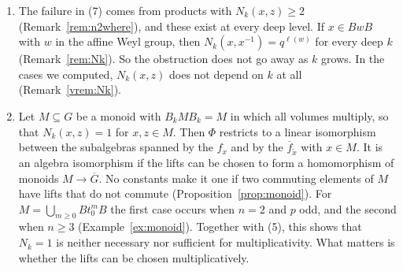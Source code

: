 \documentclass[12pt,letterpaper]{amsart}
\numberwithin{equation}{section}
\theoremstyle{definition}
\theoremstyle{remark}
\newcommand{\C}{\mathbb{C}}
\newcommand{\Gbar}{\overline{G}}
\newcommand{\fbar}{\overline{f}}
\begin{document}
\begin{enumerate}[leftmargin=2em]
homomorphism from $\Gbar$ to $\C^\times$ that is the identity on
$\mu_n$. Its kernel would then map isomorphically onto $G$, which would
give a splitting of the cover. No splitting exists, because a splitting
$s$ would satisfy $s(h(a))\,s(h(b))=(b,a)_n\,s(h(ab))$
(Lemma~\ref{lemma:nonsplit}). Choosing other lifts does not help, since
it only changes the constants by roots of unity. Constants of other
absolute values are ruled out for $n\geq 3$
(Corollary~\ref{corollary:main}), and for $n=2$ the question is open
(Question~\ref{q:n2}).
\item The failure in (7) comes from products with $N_k(x,z)\geq 2$
(Remark~\ref{rem:n2where}), and these exist at every deep level. If
$x\in BwB$ with $w$ in the affine Weyl group, then
$N_k(x,x^{-1})=q^{\ell(w)}$ for every deep $k$ (Remark~\ref{rem:Nk}).
So the obstruction does not go away as $k$ grows. In the cases we
computed, $N_k(x,z)$ does not depend on $k$ at all
(Remark~\ref{vrem:Nk}).
\item Let $M\subseteq G$ be a monoid with $B_kMB_k=M$ in which all
volumes multiply, so that $N_k(x,z)=1$ for $x,z\in M$. Then $\Phi$
restricts to a linear isomorphism between the subalgebras spanned by
the $f_x$ and by the $\fbar_{\tilde x}$ with $x\in M$. It is an algebra
isomorphism if the lifts can be chosen to form a homomorphism of
monoids $M\to\Gbar$. No constants make it one if two commuting elements
of $M$ have lifts that do not commute (Proposition~\ref{prop:monoid}).
For $M=\bigcup_{m\geq0}Bt_0^mB$ the first case occurs when $n=2$ and
$p$ odd, and the second when $n\geq 3$ (Example~\ref{ex:monoid}).
Together with (5), this shows that $N_k=1$ is neither necessary nor
sufficient for multiplicativity. What matters is whether the lifts can
be chosen multiplicatively.
\end{enumerate}
\end{document}

